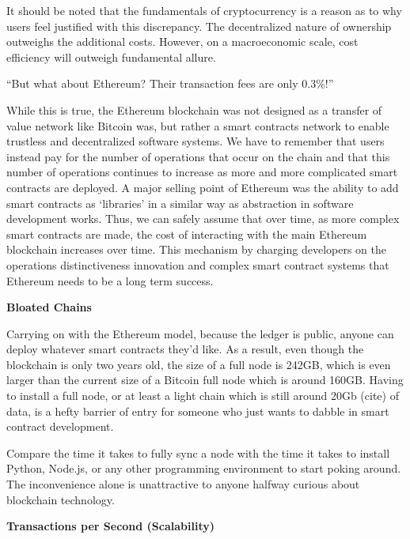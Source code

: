 \documentclass{article}
\begin{document}
It should be noted that the fundamentals of cryptocurrency is a reason as to why users feel justified with this discrepancy. The decentralized nature of ownership outweighs the additional costs. However, on a macroeconomic scale, cost efficiency will outweigh fundamental allure.

\begin{center}
“But what about Ethereum? Their transaction fees are only 0.3\%!”
\end{center}
	
While this is true, the Ethereum blockchain was not designed as a transfer of value network like Bitcoin was, but rather a smart contracts network to enable trustless and decentralized software systems. We have to remember that users instead pay for the number of operations that occur on the chain and that this number of operations continues to increase as more and more complicated smart contracts are deployed. A major selling point of Ethereum was the ability to add smart contracts as ‘libraries’ in a similar way as abstraction in software development works. Thus, we can safely assume that over time, as more complex smart contracts are made, the cost of interacting with the main Ethereum blockchain increases over time. This mechanism by charging developers on the operations distinctiveness innovation and complex smart contract systems that Ethereum needs to be a long term success.

\begin{center}
\textbf{Bloated Chains}
\end{center}

Carrying on with the Ethereum model, because the ledger is public, anyone can deploy whatever smart contracts they’d like. As a result, even though the blockchain is only two years old, the size of a full node is 242GB, which is even larger than the current size of a Bitcoin full node which is around 160GB. Having to install a full node, or at least a light chain which is still around 20Gb (cite) of data, is a hefty barrier of entry for someone who just wants to dabble in smart contract development.

Compare the time it takes to fully sync a node with the time it takes to install Python, Node.js, or any other programming environment to start poking around. The inconvenience alone is unattractive to anyone halfway curious about blockchain technology.

\begin{center}
\textbf{Transactions per Second (Scalability)}
\end{center}
\end{document}
